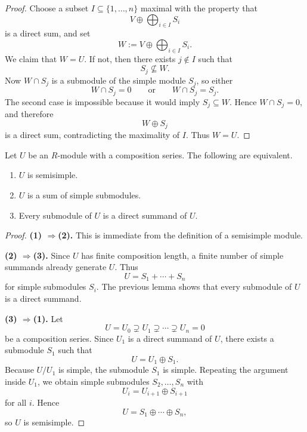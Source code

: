 \begin{proof}
    Choose a subset $I\subseteq \{1,\dots,n\}$ maximal with the property that
    \[
        V\oplus \bigoplus_{i\in I} S_i
    \]
    is a direct sum, and set
    \[
        W:=V\oplus \bigoplus_{i\in I} S_i.
    \]
    We claim that $W=U$. If not, then there exists $j\notin I$ such that
    \[
        S_j\nsubseteq W.
    \]
    Now $W\cap S_j$ is a submodule of the simple module $S_j$, so either
    \[
        W\cap S_j=0
        \qquad \text{or} \qquad
        W\cap S_j=S_j.
    \]
    The second case is impossible because it would imply $S_j\subseteq W$. Hence $W\cap S_j=0$, and therefore
    \[
        W\oplus S_j
    \]
    is a direct sum, contradicting the maximality of $I$. Thus $W=U$.
\end{proof}

\begin{theorem}
    Let $U$ be an $R$-module with a composition series. The following are equivalent.
    \begin{enumerate}
        \item $U$ is semisimple.
        \item $U$ is a sum of simple submodules.
        \item Every submodule of $U$ is a direct summand of $U$.
    \end{enumerate}
\end{theorem}

\begin{proof}
    \textbf{(1) $\Longrightarrow$(2).}
    This is immediate from the definition of a semisimple module.

    \textbf{(2) $\Longrightarrow$(3).}
    Since $U$ has finite composition length, a finite number of simple summands already
    generate $U$. Thus
    \[
        U=S_1+\cdots+S_n
    \]
    for simple submodules $S_i$. The previous lemma shows that every submodule of $U$ is
    a direct summand.

    \textbf{(3) $\Longrightarrow$(1).}
    Let
    \[
        U=U_0\supsetneq U_1\supsetneq \cdots \supsetneq U_n=0
    \]
    be a composition series. Since $U_1$ is a direct summand of $U$, there exists a
    submodule $S_1$ such that
    \[
        U=U_1\oplus S_1.
    \]
    Because $U/U_1$ is simple, the submodule $S_1$ is simple. Repeating the argument
    inside $U_1$, we obtain simple submodules $S_2,\dots,S_n$ with
    \[
        U_i=U_{i+1}\oplus S_{i+1}
    \]
    for all $i$. Hence
    \[
        U=S_1\oplus \cdots \oplus S_n,
    \]
    so $U$ is semisimple.
\end{proof}

